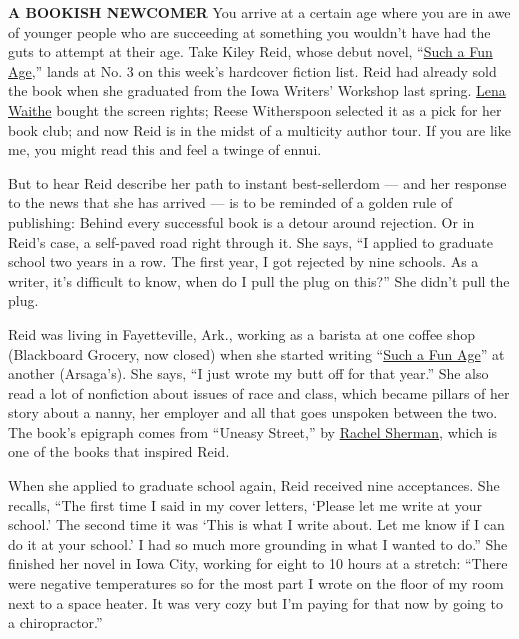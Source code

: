 \textbf{A BOOKISH NEWCOMER} You arrive at a certain age where you are in
awe of younger people who are succeeding at something you wouldn't have
had the guts to attempt at their age. Take Kiley Reid, whose debut
novel,
``\href{https://www.nytimes.com/2019/12/28/books/kiley-reid-such-a-fun-age.html}{Such
a Fun Age},'' lands at No. 3 on this week's hardcover fiction list. Reid
had already sold the book when she graduated from the Iowa Writers'
Workshop last spring.
\href{https://deadline.com/2018/08/lena-waithe-such-a-fun-age-kiley-reid-sight-unseen-coming-of-age-novel-1202454266/}{Lena
Waithe} bought the screen rights; Reese Witherspoon selected it as a
pick for her book club; and now Reid is in the midst of a multicity
author tour. If you are like me, you might read this and feel a twinge
of ennui.

But to hear Reid describe her path to instant best-sellerdom --- and her
response to the news that she has arrived --- is to be reminded of a
golden rule of publishing: Behind every successful book is a detour
around rejection. Or in Reid's case, a self-paved road right through it.
She says, ``I applied to graduate school two years in a row. The first
year, I got rejected by nine schools. As a writer, it's difficult to
know, when do I pull the plug on this?'' She didn't pull the plug.

Reid was living in Fayetteville, Ark., working as a barista at one
coffee shop (Blackboard Grocery, now closed) when she started writing
``\href{https://www.nytimes.com/2019/12/31/books/review/such-a-fun-age-kiley-reid.html}{Such
a Fun Age}'' at another (Arsaga's). She says, ``I just wrote my butt off
for that year.'' She also read a lot of nonfiction about issues of race
and class, which became pillars of her story about a nanny, her employer
and all that goes unspoken between the two. The book's epigraph comes
from ``Uneasy Street,'' by
\href{https://www.nytimes.com/2017/09/08/opinion/sunday/what-the-rich-wont-tell-you.html}{Rachel
Sherman}, which is one of the books that inspired Reid.

When she applied to graduate school again, Reid received nine
acceptances. She recalls, ``The first time I said in my cover letters,
`Please let me write at your school.' The second time it was `This is
what I write about. Let me know if I can do it at your school.' I had so
much more grounding in what I wanted to do.'' She finished her novel in
Iowa City, working for eight to 10 hours at a stretch: ``There were
negative temperatures so for the most part I wrote on the floor of my
room next to a space heater. It was very cozy but I'm paying for that
now by going to a chiropractor.''

